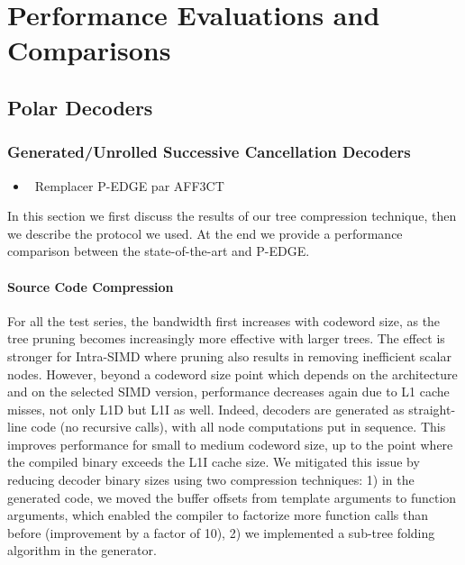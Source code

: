 \graphicspath{{main/chapter5/fig/}}

\chapter{Performance Evaluations and Comparisons}

\minitoccustom

\section{Polar Decoders}

\subsection{Generated/Unrolled Successive Cancellation Decoders}

\begin{itemize}
  \item \xmark~Remplacer P-EDGE par AFF3CT
\end{itemize}

In this section we first discuss the results of our tree compression technique,
then we describe the protocol we used. At the end we provide a performance
comparison between the state-of-the-art and P-EDGE.

\subsubsection{Source Code Compression}

For all the test series, the bandwidth first increases with codeword size, as
the tree pruning becomes increasingly more effective with larger trees. The
effect is stronger for Intra-SIMD where pruning also results in removing
inefficient scalar nodes. However, beyond a codeword size point which depends on
the architecture and on the selected SIMD version, performance decreases again
due to L1 cache misses, not only L1D but L1I as well. Indeed, decoders are
generated as straight-line code (no recursive calls), with all node computations
put in sequence. This improves performance for small to medium codeword size, up
to the point where the compiled binary exceeds the L1I cache size.
We mitigated this issue by reducing decoder binary sizes using two compression
techniques: 1) in the generated code, we moved the buffer offsets from template
arguments to function arguments, which enabled the compiler to factorize more
function calls than before (improvement by a factor of 10), 2) we implemented a
sub-tree folding algorithm in the generator.

